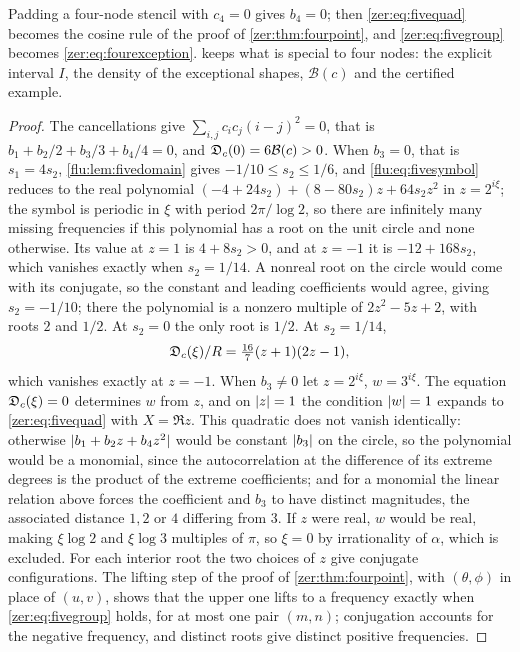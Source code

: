 Padding a four-node stencil with $c_4=0$ gives $b_4=0$; then \eqref{zer:eq:fivequad} becomes the
cosine rule of the proof of \cref{zer:thm:fourpoint}, and \eqref{zer:eq:fivegroup} becomes
\eqref{zer:eq:fourexception}.  keeps what is special to four nodes: the explicit
interval $I$, the density of the exceptional shapes, $\mathcal B(c)$ and the certified example.
\begin{proof}
The cancellations give $\sum_{i,j}c_ic_j(i-j)^2=0$, that is $b_1+b_2/2+b_3/3+b_4/4=0$, and
$\mathfrak{D}_c(0)=6\mathcal B(c)>0$. When $b_3=0$, that is $s_1=4s_2$, \cref{flu:lem:fivedomain} gives
$-1/10\le s_2\le1/6$, and \eqref{flu:eq:fivesymbol} reduces to the real polynomial
$(-4+24s_2)+(8-80s_2)z+64s_2z^2$ in $z=2^{i\xi}$; the symbol is periodic in $\xi$ with period $2\pi/\log2$, so
there are infinitely many missing frequencies if this polynomial has a root on the unit circle and none
otherwise. Its value at $z=1$ is $4+8s_2>0$, and at $z=-1$ it is $-12+168s_2$, which vanishes exactly when
$s_2=1/14$. A nonreal root on the circle would come with its conjugate, so the constant and leading
coefficients would agree, giving $s_2=-1/10$; there the polynomial is a nonzero multiple of
$2z^2-5z+2$, with roots $2$ and $1/2$. At $s_2=0$ the only root is $1/2$. At $s_2=1/14$,
\begin{equation}\label{flu:eq:fivespecial}
 \mathfrak{D}_c(\xi)/R=\tfrac{16}7(z+1)(2z-1),
\end{equation}
which vanishes exactly at $z=-1$. When $b_3\ne0$ let $z=2^{i\xi}$, $w=3^{i\xi}$. The equation $\mathfrak{D}_c(\xi)=0$ determines
$w$ from $z$, and on $\lvert z\rvert=1$ the condition $\lvert w\rvert=1$ expands to \eqref{zer:eq:fivequad} with $X=\Re z$. This
quadratic does not vanish identically: otherwise $\lvert b_1+b_2z+b_4z^2\rvert$ would be constant $\lvert b_3\rvert$ on the
circle, so the polynomial would be a monomial, since the autocorrelation at the difference of its extreme
degrees is the product of the extreme coefficients; and for a monomial the linear relation above forces
the coefficient and $b_3$ to have distinct magnitudes, the associated distance $1,2$ or $4$ differing from
$3$. If $z$ were real, $w$ would be real, making $\xi\log2$ and $\xi\log3$ multiples of $\pi$, so $\xi=0$ by
irrationality of $\alpha$, which is excluded. For each interior root the two choices of $z$ give conjugate
configurations. The lifting step of the proof of \cref{zer:thm:fourpoint}, with $(\theta,\phi)$ in place of
$(u,v)$, shows that the upper one lifts to a frequency exactly when \eqref{zer:eq:fivegroup} holds, for at most
one pair $(m,n)$; conjugation accounts for the negative frequency, and distinct roots give distinct
positive frequencies.
\end{proof}

